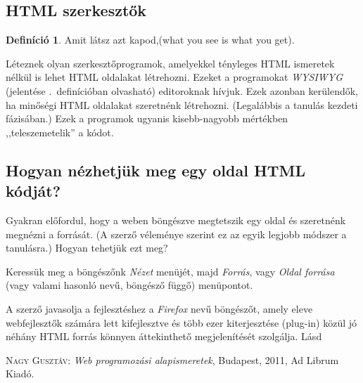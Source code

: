 \documentclass[12pt,twoside]{report}
\theoremstyle{definition}
\newtheorem{definicio}{Definíció}[chapter]
\begin{document}
\subsection{HTML szerkesztők}
\begin{definicio}\label{definicio:WYSIWYG}
	Amit látsz azt kapod,(what you see is what you get).
\end{definicio}
Léteznek olyan szerkesztőprogramok, amelyekkel tényleges HTML ismeretek nélkül is lehet HTML oldalakat létrehozni. Ezeket a programokat \emph{WYSIWYG} (jelentése \az{\ref{definicio:WYSIWYG}}.~definícióban olvasható) editoroknak hívjuk. Ezek azonban kerülendők, ha minőségi HTML oldalakat szeretnénk létrehozni. (Legalábbis a tanulás kezdeti fázisában.) Ezek a programok ugyanis kisebb-nagyobb mértékben ,,teleszemetelik'' a kódot.
\subsection{Hogyan nézhetjük meg egy oldal HTML kódját?}
Gyakran előfordul, hogy a weben böngészve megtetszik egy oldal és szeretnénk megnézni a forrását. (A szerző véleménye szerint ez az egyik legjobb módszer a tanulásra.) Hogyan tehetjük ezt meg?

Keressük meg a böngészőnk \emph{Nézet} menüjét, majd \emph{Forrás}, vagy \emph{Oldal forrása} (vagy valami hasonló nevű, böngésző függő) menüpontot.

A szerző javasolja a fejlesztéshez a \emph{Firefox} nevű böngészőt, amely eleve webfejlesztők számára lett kifejlesztve és több ezer kiterjesztése (plug-in) közül jó néhány HTML forrás könnyen áttekinthető megjelenítését szolgálja. Lásd \cite[33.~oldal]{NAGY}
	\begin{thebibliography}{1}
		 \textsc{Nagy Gusztáv}: \emph{Web programozási alapismeretek}, Budapest, 2011, Ad Librum Kiadó.
	\end{thebibliography}
\end{document}
